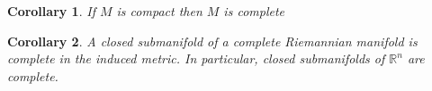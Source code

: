 \documentclass[a4paper]{article}
\newtheorem*{cor}{Corollary}
\begin{document}
\begin{cor}
 If $M$ is compact then $M$ is complete 
\end{cor}

\begin{cor}
  A closed submanifold of a complete Riemannian manifold is complete in the induced metric. In particular, closed submanifolds of $\mathds{R}^n$ are complete. 
\end{cor}
\end{document}
